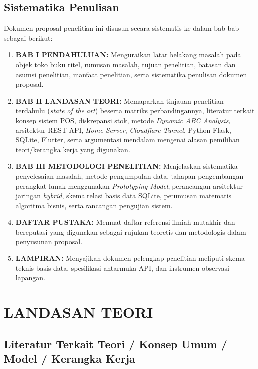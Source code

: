 \documentclass[11pt, a4paper]{article}
\begin{document}
\subsection{Sistematika Penulisan}
Dokumen proposal penelitian ini disusun secara sistematis ke dalam bab-bab sebagai berikut:
\begin{enumerate}[label=\arabic*.]
    \item \textbf{BAB I PENDAHULUAN:} Menguraikan latar belakang masalah pada objek toko buku ritel, rumusan masalah, tujuan penelitian, batasan dan asumsi penelitian, manfaat penelitian, serta sistematika penulisan dokumen proposal.
    \item \textbf{BAB II LANDASAN TEORI:} Memaparkan tinjauan penelitian terdahulu (\textit{state of the art}) beserta matriks perbandingannya, literatur terkait konsep sistem POS, diskrepansi stok, metode \textit{Dynamic ABC Analysis}, arsitektur REST API, \textit{Home Server}, \textit{Cloudflare Tunnel}, Python Flask, SQLite, Flutter, serta argumentasi mendalam mengenai alasan pemilihan teori/kerangka kerja yang digunakan.
    \item \textbf{BAB III METODOLOGI PENELITIAN:} Menjelaskan sistematika penyelesaian masalah, metode pengumpulan data, tahapan pengembangan perangkat lunak menggunakan \textit{Prototyping Model}, perancangan arsitektur jaringan \textit{hybrid}, skema relasi basis data SQLite, perumusan matematis algoritma bisnis, serta rancangan pengujian sistem.
    \item \textbf{DAFTAR PUSTAKA:} Memuat daftar referensi ilmiah mutakhir dan bereputasi yang digunakan sebagai rujukan teoretis dan metodologis dalam penyusunan proposal.
    \item \textbf{LAMPIRAN:} Menyajikan dokumen pelengkap penelitian meliputi skema teknis basis data, spesifikasi antarmuka API, dan instrumen observasi lapangan.
\end{enumerate}

\newpage
\section{LANDASAN TEORI}

\subsection{Literatur Terkait Teori / Konsep Umum / Model / Kerangka Kerja}
\end{document}
